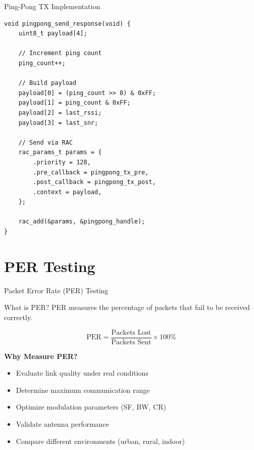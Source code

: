 \documentclass{beamer}
\begin{document}
\begin{frame}[fragile]{Ping-Pong TX Implementation}
\begin{lstlisting}[caption={Transmit Pong Response}]
void pingpong_send_response(void) {
    uint8_t payload[4];

    // Increment ping count
    ping_count++;

    // Build payload
    payload[0] = (ping_count >> 8) & 0xFF;
    payload[1] = ping_count & 0xFF;
    payload[2] = last_rssi;
    payload[3] = last_snr;

    // Send via RAC
    rac_params_t params = {
        .priority = 128,
        .pre_callback = pingpong_tx_pre,
        .post_callback = pingpong_tx_post,
        .context = payload,
    };

    rac_add(&params, &pingpong_handle);
}
\end{lstlisting}
\end{frame}

\section{PER Testing}

\begin{frame}{Packet Error Rate (PER) Testing}
\begin{block}{What is PER?}
PER measures the percentage of packets that fail to be received correctly.

\[
\text{PER} = \frac{\text{Packets Lost}}{\text{Packets Sent}} \times 100\%
\]
\end{block}

\vspace{0.3cm}

\textbf{Why Measure PER?}
\begin{itemize}
    \item Evaluate link quality under real conditions
    \item Determine maximum communication range
    \item Optimize modulation parameters (SF, BW, CR)
    \item Validate antenna performance
    \item Compare different environments (urban, rural, indoor)
\end{itemize}
\end{frame}
\end{document}
